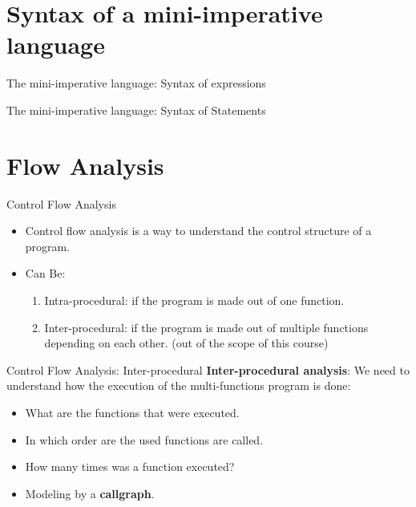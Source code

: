 \section{Syntax of a mini-imperative language}
\begin{frame}{The mini-imperative language: Syntax of expressions}
\centering


\end{frame}

\begin{frame}{The mini-imperative language: Syntax of Statements}
\centering


\end{frame}

\section{Flow Analysis}
\begin{frame}{Control Flow Analysis}
\begin{itemize}
\item Control flow analysis is a way to understand the control structure of a program.

\item Can Be:
\begin{enumerate}
\item Intra-procedural: if the program is made out of one function.	
\item Inter-procedural: if the program is made out of multiple functions depending on each other. (out of the scope of this course)	
\end{enumerate}
\end{itemize}
\end{frame}


\begin{frame}{Control Flow Analysis: Inter-procedural}
\textbf{Inter-procedural analysis}: We need to understand how the execution of the multi-functions program is done:
\begin{itemize}
	\item What are the functions that were executed.
	\item In which order are the used functions are called.
	\item How many times was a function executed?
	\item Modeling by a \textbf{callgraph}.
\end{itemize}
\end{frame}

